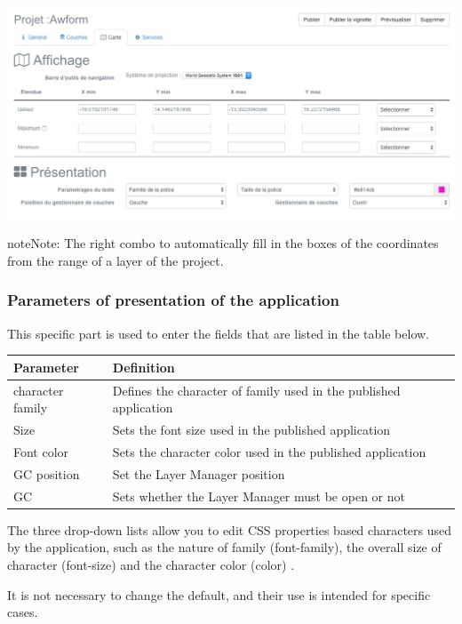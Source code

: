\documentclass[letterpaper,10pt,english]{sphinxmanual}
\begin{document}
\includegraphics[width=1.000\linewidth]{publisher-map-conf.png}

\begin{notice}{note}{Note:}
The right combo to automatically fill in the boxes of the coordinates from the range of a layer of the project.
\end{notice}


\subsubsection{Parameters of presentation of the application}
\label{apps/appconfig:parametres-de-presentation-de-l-application}
This specific part is used to enter the fields that are listed in the table below.

\begin{tabulary}{\linewidth}{|L|L|}
\hline

\textbf{Parameter}
 & 
\textbf{Definition}
\\
\hline
character family
 & 
Defines the character of family used in the published application
\\
\hline
Size
 & 
Sets the font size used in the published application
\\
\hline
Font color
 & 
Sets the character color used in the published application
\\
\hline
GC position
 & 
Set the Layer Manager position
\\
\hline
GC
 & 
Sets whether the Layer Manager must be open or not
\\
\hline\end{tabulary}


The three drop-down lists allow you to edit CSS properties based characters used by the application, such as the nature of family (font-family), the overall size of character (font-size) and the character color (color) .

It is not necessary to change the default, and their use is intended for specific cases.
\end{document}
